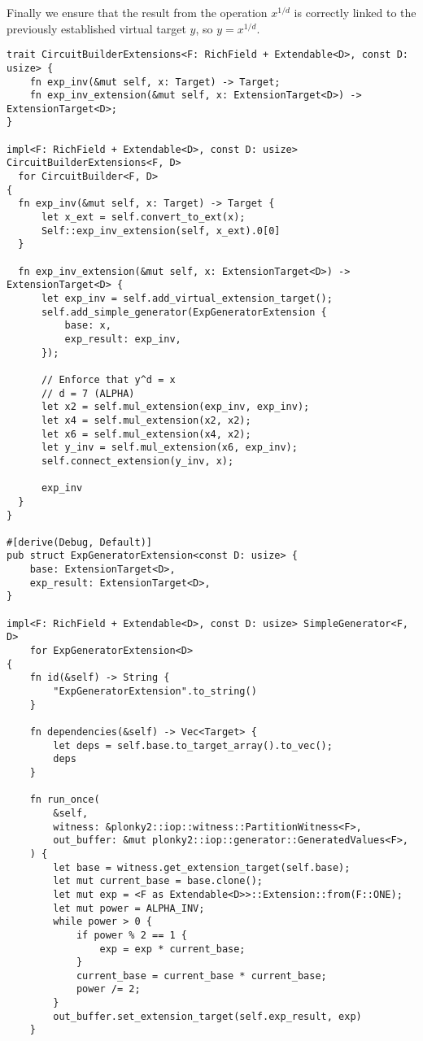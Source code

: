 Finally we ensure that the result from the operation $x^{1/d}$ is correctly linked to the previously established virtual target $y$, so $y=x^{1/d}$.
\vspace{1em}

\begin{lstlisting}
trait CircuitBuilderExtensions<F: RichField + Extendable<D>, const D: usize> {
    fn exp_inv(&mut self, x: Target) -> Target;
    fn exp_inv_extension(&mut self, x: ExtensionTarget<D>) -> ExtensionTarget<D>;
}

impl<F: RichField + Extendable<D>, const D: usize> CircuitBuilderExtensions<F, D> 
  for CircuitBuilder<F, D>
{
  fn exp_inv(&mut self, x: Target) -> Target {
      let x_ext = self.convert_to_ext(x);
      Self::exp_inv_extension(self, x_ext).0[0]
  }

  fn exp_inv_extension(&mut self, x: ExtensionTarget<D>) -> ExtensionTarget<D> {
      let exp_inv = self.add_virtual_extension_target();
      self.add_simple_generator(ExpGeneratorExtension {
          base: x,
          exp_result: exp_inv,
      });

      // Enforce that y^d = x
      // d = 7 (ALPHA)
      let x2 = self.mul_extension(exp_inv, exp_inv);
      let x4 = self.mul_extension(x2, x2);
      let x6 = self.mul_extension(x4, x2);
      let y_inv = self.mul_extension(x6, exp_inv);
      self.connect_extension(y_inv, x);

      exp_inv
  }
}

#[derive(Debug, Default)]
pub struct ExpGeneratorExtension<const D: usize> {
    base: ExtensionTarget<D>,
    exp_result: ExtensionTarget<D>,
}

impl<F: RichField + Extendable<D>, const D: usize> SimpleGenerator<F, D>
    for ExpGeneratorExtension<D>
{
    fn id(&self) -> String {
        "ExpGeneratorExtension".to_string()
    }

    fn dependencies(&self) -> Vec<Target> {
        let deps = self.base.to_target_array().to_vec();
        deps
    }

    fn run_once(
        &self,
        witness: &plonky2::iop::witness::PartitionWitness<F>,
        out_buffer: &mut plonky2::iop::generator::GeneratedValues<F>,
    ) {
        let base = witness.get_extension_target(self.base);
        let mut current_base = base.clone();
        let mut exp = <F as Extendable<D>>::Extension::from(F::ONE);
        let mut power = ALPHA_INV;
        while power > 0 {
            if power % 2 == 1 {
                exp = exp * current_base;
            }
            current_base = current_base * current_base;
            power /= 2;
        }
        out_buffer.set_extension_target(self.exp_result, exp)
    }


\end{lstlisting}
